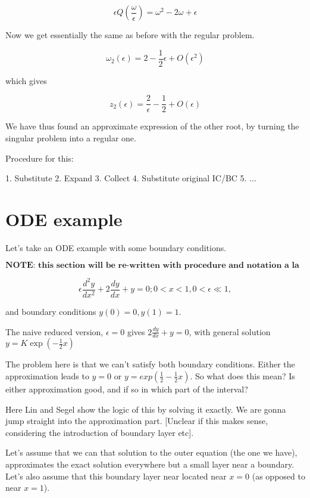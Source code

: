 \documentclass[12pt]{report}
\begin{document}
$$\epsilon Q(\frac \omega \epsilon) = \omega^2 - 2\omega + \epsilon$$

Now we get essentially the same as before with the regular problem.

$$\omega_2(\epsilon) = 2 - \frac 1 2 \epsilon + O(\epsilon^2)$$

which gives

$$z_2(\epsilon) = \frac 2 \epsilon - \frac 1 2 + O(\epsilon)$$

We have thus found an approximate expression of the other root, by turning the
singular problem into a regular one.

Procedure for this:

1. Substitute
2. Expand
3. Collect
4. Substitute original IC/BC
5. ...

\section{ODE example}

Let's take an ODE example with some boundary conditions.

$\textbf{NOTE: this section will be re-written with procedure and notation a la
Holmes page 58-63 - more clear wrt boundary-layer coordinates and scales, and
less notation generally. Following is not clear at all, especially towards the
end.}$

\begin{equation}
    \epsilon \frac{d^2y}{dx^2} + 2 \frac{dy}{dx} + y = 0; 0 < x < 1, 0 <
\epsilon \ll 1,
\end{equation}

and boundary conditions $y(0)=0, y(1) =1$.

The naive reduced version, $\epsilon = 0$ gives $2 \frac{dy}{dx} + y = 0$, with
general solution $y=K \exp(-\frac{1}{2} x)$

The problem here is that we can't satisfy both boundary conditions. Either the
approximation leads to $y=0$ or $y=exp(\frac 1 2 - \frac 1 2 x)$. So what does
this mean? Is either approximation good, and if so in which part of the
interval?

Here Lin and Segel show the logic of this by solving it exactly. We are gonna
jump straight into the approximation part. [Unclear if this makes sense,
considering the introduction of boundary layer etc].

Let's assume that we can that solution to the outer equation (the one we have),
approximates the exact solution everywhere but a small layer near a boundary.
Let's also assume that this boundary layer near located near $x=0$ (as opposed to near $x=1$).
\end{document}
